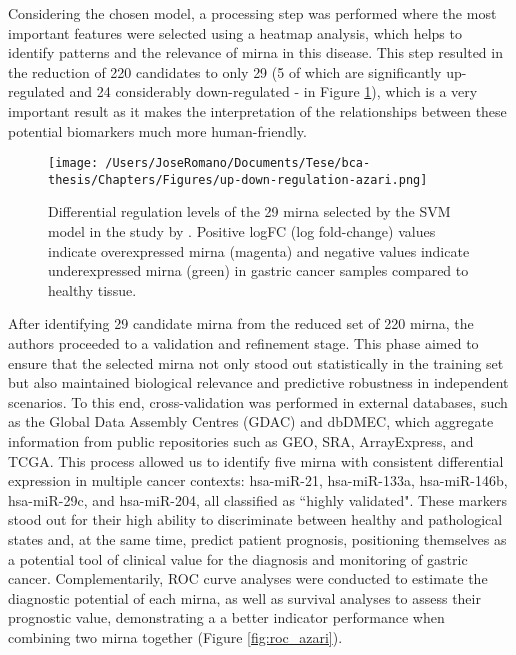 Considering the chosen model, a processing step was performed where the most
important features were selected using a heatmap analysis, which helps to
identify patterns and the relevance of \gls{mirna} in this disease. This step
resulted in the reduction of 220 candidates to only 29 (5 of which are
significantly up-regulated and 24 considerably down-regulated - in Figure
\ref{fig:regulation_levels}), which is a very important result as it makes the
interpretation of the relationships between these potential biomarkers much
more human-friendly.

\begin{figure}
  \centering
  \texttt{[image: /Users/JoseRomano/Documents/Tese/bca-thesis/Chapters/Figures/up-down-regulation-azari.png]}
  \caption{
    Differential regulation levels of the 29 \gls{mirna} selected by the SVM model in the study by \textcite{ml_gastric_Azari2023}. Positive logFC (log fold-change) values indicate overexpressed \gls{mirna} (magenta) and negative values indicate underexpressed \gls{mirna} (green) in gastric cancer samples compared to healthy tissue.}
  \label{fig:regulation_levels}
\end{figure}

After identifying 29 candidate \gls{mirna} from the reduced set of 220
\gls{mirna}, the authors proceeded to a validation and refinement stage. This
phase aimed to ensure that the selected \gls{mirna} not only stood out
statistically in the training set but also maintained biological relevance and
predictive robustness in independent scenarios. To this end, cross-validation
was performed in external databases, such as the Global Data Assembly Centres
(GDAC) and dbDMEC, which aggregate information from public repositories such as
GEO, SRA, ArrayExpress, and TCGA. This process allowed us to identify five
\gls{mirna} with consistent differential expression in multiple cancer
contexts: hsa-miR-21, hsa-miR-133a, hsa-miR-146b, hsa-miR-29c, and hsa-miR-204,
all classified as “highly validated". These markers stood out for their high
ability to discriminate between healthy and pathological states and, at the
same time, predict patient prognosis, positioning themselves as a potential
tool of clinical value for the diagnosis and monitoring of gastric cancer.
Complementarily, ROC curve analyses were conducted to estimate the diagnostic
potential of each \gls{mirna}, as well as survival analyses to assess their
prognostic value, demonstrating a a better indicator performance when combining
two \gls{mirna} together (Figure \ref{fig:roc_azari}).

